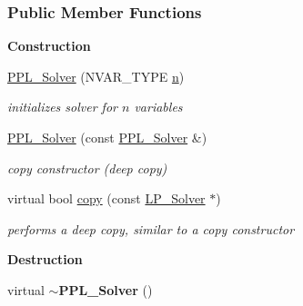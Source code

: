 \subsubsection*{Public Member Functions}
\begin{Indent}\textbf{ Construction}\par
\begin{DoxyCompactItemize}
\item 
\mbox{\label{group___c_l_s_solvers_a7484421e15572f77d014b2feb9d79f04}} 
\hyperlink{group___c_l_s_solvers_a7484421e15572f77d014b2feb9d79f04}{P\+P\+L\+\_\+\+Solver} (N\+V\+A\+R\+\_\+\+T\+Y\+PE \hyperlink{group___c_l_s_solvers_aa70891def9af366c47e01acf952bbdba}{n})
\begin{DoxyCompactList}\small\item\em initializes solver for $ n $ variables \end{DoxyCompactList}\item 
\mbox{\label{group___c_l_s_solvers_a7aa1c2c02e059f35f9d9faca9e94f859}} 
\hyperlink{group___c_l_s_solvers_a7aa1c2c02e059f35f9d9faca9e94f859}{P\+P\+L\+\_\+\+Solver} (const \hyperlink{group___c_l_s_solvers_class_p_p_l___solver}{P\+P\+L\+\_\+\+Solver} \&)
\begin{DoxyCompactList}\small\item\em copy constructor (deep copy) \end{DoxyCompactList}\item 
virtual bool \hyperlink{group___c_l_s_solvers_a67408174d2260de5ae5f070a70f27e9d}{copy} (const \hyperlink{group___c_l_s_solvers_class_l_p___solver}{L\+P\+\_\+\+Solver} $\ast$)
\begin{DoxyCompactList}\small\item\em performs a deep copy, similar to a copy constructor \end{DoxyCompactList}\end{DoxyCompactItemize}
\end{Indent}
\begin{Indent}\textbf{ Destruction}\par
\begin{DoxyCompactItemize}
\item 
\mbox{\label{group___c_l_s_solvers_aecb2caed09777ca3b6d5e285540abe56}} 
virtual {\bfseries $\sim$\+P\+P\+L\+\_\+\+Solver} ()
\end{DoxyCompactItemize}
\end{Indent}
